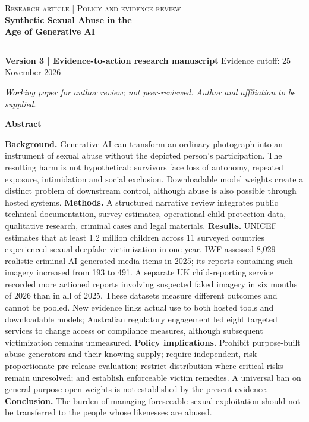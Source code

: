 \documentclass[10pt,a4paper]{article}
\begin{document}
\thispagestyle{empty}
{\large\textsc{Research article | Policy and evidence review}}\\[8mm]
{\color{ink}\fontsize{25}{29}\selectfont\bfseries Synthetic Sexual Abuse in the\\Age of Generative AI}\par
\vspace{3mm}{\Large Evidence of harm, accountability gaps, and the case\\for targeted prohibition and release controls}\par
\vspace{4mm}\rule{\linewidth}{0.8pt}\par
\textbf{Version 3 | Evidence-to-action research manuscript} \hfill Evidence cutoff: 25 November 2026\par
\textit{Working paper for author review; not peer-reviewed. Author and affiliation to be supplied.}\par
\vspace{3mm}\textbf{Abstract}\par

\textbf{Background.} Generative AI can transform an ordinary photograph into an instrument of sexual abuse without the depicted person's participation. The resulting harm is not hypothetical: survivors face loss of autonomy, repeated exposure, intimidation and social exclusion. Downloadable model weights create a distinct problem of downstream control, although abuse is also possible through hosted systems. \textbf{Methods.} A structured narrative review integrates public technical documentation, survey estimates, operational child-protection data, qualitative research, criminal cases and legal materials. \textbf{Results.} UNICEF estimates that at least 1.2 million children across 11 surveyed countries experienced sexual deepfake victimization in one year. IWF assessed 8,029 realistic criminal AI-generated media items in 2025; its reports containing such imagery increased from 193 to 491. A separate UK child-reporting service recorded more actioned reports involving suspected faked imagery in six months of 2026 than in all of 2025. These datasets measure different outcomes and cannot be pooled. New evidence links actual use to both hosted tools and downloadable models; Australian regulatory engagement led eight targeted services to change access or compliance measures, although subsequent victimization remains unmeasured. \cite{ausmodels,ausbill} \textbf{Policy implications.} Prohibit purpose-built abuse generators and their knowing supply; require independent, risk-proportionate pre-release evaluation; restrict distribution where critical risks remain unresolved; and establish enforceable victim remedies. A universal ban on general-purpose open weights is not established by the present evidence. \textbf{Conclusion.} The burden of managing foreseeable sexual exploitation should not be transferred to the people whose likenesses are abused. \cite{iwf,unicef12,reportremove,deepfakeimpact,uknotes,ntia}
\end{document}
